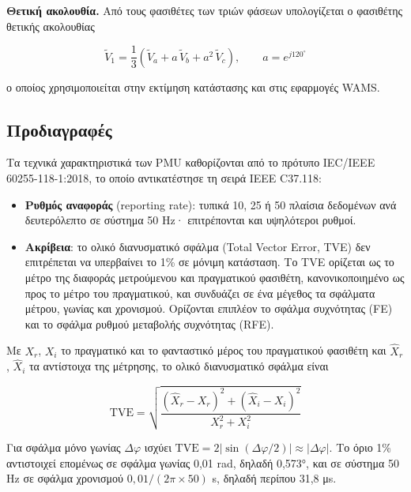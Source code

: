 \textbf{Θετική ακολουθία.} Από τους φασιθέτες των τριών φάσεων υπολογίζεται ο φασιθέτης θετικής
ακολουθίας

\begin{equation}
\tilde{V}_1 = \frac{1}{3}\left(\tilde{V}_a + a\,\tilde{V}_b + a^2\,\tilde{V}_c\right),
\qquad a = e^{j120^\circ}
\label{eq:posseq}
\end{equation}

ο οποίος χρησιμοποιείται στην εκτίμηση κατάστασης και στις εφαρμογές WAMS.


\subsection{Προδιαγραφές}

Τα τεχνικά χαρακτηριστικά των PMU καθορίζονται από το πρότυπο IEC/IEEE 60255-118-1:2018, το
οποίο αντικατέστησε τη σειρά IEEE C37.118:

\begin{itemize}
\item \textbf{Ρυθμός αναφοράς} (reporting rate): τυπικά 10, 25 ή 50 πλαίσια δεδομένων ανά
      δευτερόλεπτο σε σύστημα 50 Hz· επιτρέπονται και υψηλότεροι ρυθμοί.
\item \textbf{Ακρίβεια}: το ολικό διανυσματικό σφάλμα (Total Vector Error, TVE) δεν
      επιτρέπεται να υπερβαίνει το 1\% σε μόνιμη κατάσταση. Το TVE ορίζεται ως το μέτρο της
      διαφοράς μετρούμενου και πραγματικού φασιθέτη, κανονικοποιημένο ως προς το μέτρο του
      πραγματικού, και συνδυάζει σε ένα μέγεθος τα σφάλματα μέτρου, γωνίας και χρονισμού.
      Ορίζονται επιπλέον το σφάλμα συχνότητας (FE) και το σφάλμα ρυθμού μεταβολής
      συχνότητας (RFE).
\end{itemize}

Με $X_r$, $X_i$ το πραγματικό και το φανταστικό μέρος του πραγματικού φασιθέτη και
$\hat{X}_r$, $\hat{X}_i$ τα αντίστοιχα της μέτρησης, το ολικό διανυσματικό σφάλμα είναι

\begin{equation}
\mathrm{TVE} = \sqrt{\frac{(\hat{X}_r - X_r)^2 + (\hat{X}_i - X_i)^2}{X_r^2 + X_i^2}}
\label{eq:tve}
\end{equation}

Για σφάλμα μόνο γωνίας $\Delta\varphi$ ισχύει
$\mathrm{TVE} = 2\left|\sin(\Delta\varphi/2)\right| \approx |\Delta\varphi|$. Το όριο 1\%
αντιστοιχεί επομένως σε σφάλμα γωνίας 0,01 rad, δηλαδή 0,573°, και σε σύστημα 50 Hz σε σφάλμα
χρονισμού $0{,}01 / (2\pi \times 50)$ s, δηλαδή περίπου 31,8 μs.

